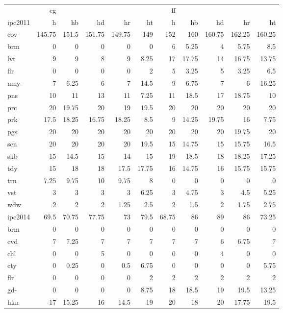 \begin{center}
\begin{tabular}{lrrrrrrrrrr}
\hline
 & cg &  &  &  &  & ff &  &  &  & \\
ipc2011 & h & hb & hd & hr & ht & h & hb & hd & hr & ht\\
\hline
cov & 145.75 & 151.5 & 151.75 & 149.75 & 149 & 152 & 160 & 160.75 & 162.25 & 160.25\\
\hline
brm & 0 & 0 & 0 & 0 & 0 & 6 & 5.25 & 4 & 5.75 & 8.5\\
lvt & 9 & 9 & 8 & 9 & 8.25 & 17 & 17.75 & 14 & 16.75 & 13.75\\
flr & 0 & 0 & 0 & 0 & 2 & 5 & 3.25 & 5 & 3.25 & 6.5\\
nmy & 7 & 6.25 & 6 & 7 & 14.5 & 9 & 6.75 & 7 & 6 & 16.25\\
pns & 10 & 11 & 13 & 11 & 7.25 & 11 & 18.5 & 17 & 18.75 & 10\\
prc & 20 & 19.75 & 20 & 19 & 19.5 & 20 & 20 & 20 & 20 & 20\\
prk & 17.5 & 18.25 & 16.75 & 18.25 & 8.5 & 9 & 14.25 & 19.75 & 16 & 7.75\\
pgs & 20 & 20 & 20 & 20 & 20 & 20 & 20 & 20 & 19.75 & 20\\
scn & 20 & 20 & 20 & 20 & 19.5 & 15 & 14.75 & 15 & 15.75 & 16.5\\
skb & 15 & 14.5 & 15 & 14 & 15 & 19 & 18.5 & 18 & 18.25 & 17.25\\
tdy & 15 & 18 & 18 & 17.5 & 17.75 & 16 & 14.75 & 16 & 15.75 & 15.75\\
trn & 7.25 & 9.75 & 10 & 9.75 & 8 & 0 & 0 & 0 & 0 & 0\\
vst & 3 & 3 & 3 & 3 & 6.25 & 3 & 4.75 & 3 & 4.5 & 5.25\\
wdw & 2 & 2 & 2 & 1.25 & 2.5 & 2 & 1.5 & 2 & 1.75 & 2.75\\
\hline
ipc2014 & 69.5 & 70.75 & 77.75 & 73 & 79.5 & 68.75 & 86 & 89 & 86 & 73.25\\
\hline
brm & 0 & 0 & 0 & 0 & 0 & 0 & 0 & 0 & 0 & 0\\
cvd & 7 & 7.25 & 7 & 7 & 7 & 7 & 7 & 6 & 6.75 & 7\\
chl & 0 & 0 & 5 & 0 & 0 & 0 & 0 & 4 & 0 & 0\\
cty & 0 & 0.25 & 0 & 0.5 & 6.75 & 0 & 0 & 0 & 0 & 5.75\\
flr & 0 & 0 & 0 & 0 & 2 & 2 & 2 & 2 & 2 & 2\\
gd- & 0 & 0 & 0 & 0 & 8.75 & 18 & 18.5 & 19 & 19.5 & 13.25\\
hkn & 17 & 15.25 & 16 & 14.5 & 19 & 20 & 18 & 20 & 17.75 & 19.5\\

\end{tabular}
\end{center}
